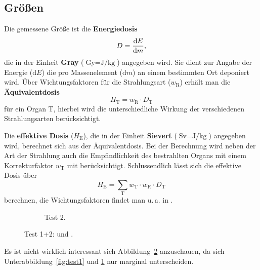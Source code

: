 \documentclass[german,  %
parskip=full,  %
]{scrartcl}
\begin{document}
    \subsection{Größen}
    Die gemessene Größe ist die \textbf{Energiedosis}
    \begin{equation}
    D = \dv{E}{m},
    \end{equation}
    die in der
    Einheit \textbf{Gray} ($\si{\gray} = \si{\joule\per\kg}$) angegeben wird.
    Sie dient zur Angabe der Energie ($\mathrm{d}E$) die pro
    Massenelement ($\mathrm{d}m$) an einem bestimmten Ort deponiert wird.
    Über Wichtungsfaktoren für die Strahlungsart ($w_\mathrm{R}$) erhält man
    die \textbf{Äquivalentdosis}
    \begin{equation}
    H_\mathrm{T} = w_\mathrm{R}\cdot D_\mathrm{T}
    \end{equation}
    für ein Organ $\mathrm{T}$, hierbei wird die unterschiedliche Wirkung der
    verschiedenen Strahlungsarten berücksichtigt.

    Die \textbf{effektive Dosis} ($H_\text{E}$),
    die in der
    Einheit \textbf{Sievert} ($\si{\sievert}=\si{\joule\per\kilogram}$)
    angegeben wird, berechnet sich aus der Äquivalentdosis. Bei der Berechnung
    wird neben der Art der Strahlung auch die Empfindlichkeit des bestrahlten
    Organs mit einem Korrekturfaktor $w_\mathrm{T}$ mit berücksichtigt.
    Schlussendlich lässt sich die effektive Dosis über
    \begin{equation}
    H_\mathrm{E}
    = \sum\limits_\mathrm{T} w_\mathrm{T}\cdot w_\mathrm{R}\cdot D_\mathrm{T}
    \end{equation}
    berechnen, die Wichtungsfaktoren findet man u.\,a. in
    \cite[Anlage VI]{strlschv}.
    
    \begin{figure}[htbp]
    \centering
    \begin{subfigure}{.45\textwidth}
    \caption{Test 2.}\label{fig:test2}
    \end{subfigure}
    \caption{Test 1+2:  und .}
    \label{fig:test}
    \end{figure}
    
    Es ist nicht wirklich interessant sich Abbildung~\ref{fig:test} anzuschauen,
    da sich Unterabbildung~\ref{fig:test1} und \ref{fig:test2} nur marginal
    unterscheiden.
\end{document}
